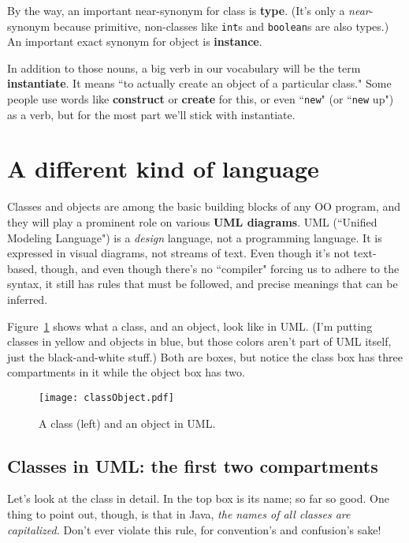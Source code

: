 By the way, an important near-synonym for class is \textbf{type}. (It's only a
\textit{near}-synonym because primitive, non-classes like \texttt{int}s and
\texttt{boolean}s are also types.) An important exact synonym for object is
\textbf{instance}.

In addition to those nouns, a big verb in our vocabulary will be the term
\textbf{instantiate}. It means ``to actually create an object of a particular
class." Some people use words like \textbf{construct} or \textbf{create} for
this, or even ``\texttt{new}" (or ``\texttt{new} up") as a verb, but for the
most part we'll stick with instantiate.


\section{A different kind of language}
\label{sec:UMLclasses}

Classes and objects are among the basic building blocks of any OO program, and
they will play a prominent role on various \textbf{UML diagrams}. UML
(``Unified Modeling Language") is a \textit{design} language, not a
programming language. It is expressed in visual diagrams, not streams of text.
Even though it's not text-based, though, and even though there's no
``compiler" forcing us to adhere to the syntax, it still has rules that must
be followed, and precise meanings that can be inferred.

Figure~\ref{fig:classObject} shows what a class, and an object, look like in
UML. (I'm putting classes in yellow and objects in blue, but those colors
aren't part of UML itself, just the black-and-white stuff.) Both are boxes,
but notice the class box has three compartments in it while the object box has
two.

\begin{figure}[ht]
\centering
\texttt{[image: classObject.pdf]}   %
\caption{A class (left) and an object in UML.}
\label{fig:classObject}
\end{figure}

\subsection{Classes in UML: the first two compartments}

Let's look at the class in detail. In the top box is its name; so far so good.
One thing to point out, though, is that in Java, \textit{the names of all
classes are capitalized.} Don't ever violate this rule, for convention's and
confusion's sake!

